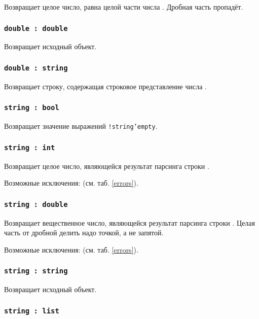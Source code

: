 Возвращает целое число, равна целой части числа \double. Дробная часть пропадёт.

\subsubsection{\texttt{double : double}}

Возвращает исходный объект.

\subsubsection{\texttt{double : string}}

Возвращает строку, содержащая строковое представление числа \double.

\subsubsection{\texttt{string : bool}}

Возвращает значение выражений \texttt{!string'empty}.

\subsubsection{\texttt{string : int}}

Возвращает целое число, являющейся результат парсинга строки \str.

Возможные исключения:  (см. таб. \ref{errors}).

\subsubsection{\texttt{string : double}}

Возвращает вещественное число, являющейся результат парсинга строки \str. Целая часть от дробной делить надо точкой, а не запятой.

Возможные исключения:  (см. таб. \ref{errors}).

\subsubsection{\texttt{string : string}}

Возвращает исходный объект.

\subsubsection{\texttt{string : list}}

